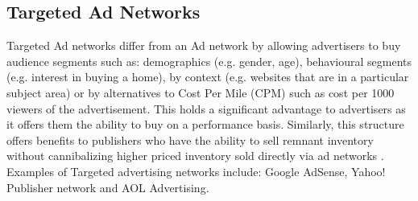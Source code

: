 \documentclass{article}
\begin{document}
\subsection{Targeted Ad Networks}
Targeted Ad networks differ from an Ad network by allowing advertisers to buy audience segments such as: demographics (e.g. gender, age),  behavioural segments (e.g. interest in buying a home), by context (e.g. websites that are in a particular subject area) or by alternatives to Cost Per Mile (CPM) such as cost per 1000 viewers of the advertisement. This holds a significant advantage to advertisers as it offers them the ability to buy on a performance basis. Similarly, this structure offers benefits to publishers who have the ability to sell remnant inventory without cannibalizing higher priced inventory sold directly via ad networks \parencite{adExchanges}. Examples of Targeted advertising networks include: Google AdSense, Yahoo! Publisher network and AOL Advertising. 
\end{document}
